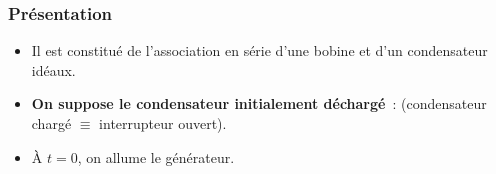 \documentclass[../../main/main.tex]{subfiles}
\begin{document}
\subsubsection{Présentation}
\begin{minipage}[c]{.6\linewidth}
	\begin{itemize}
		\item Il est constitué de l'association en série d'une bobine et d'un
		      condensateur idéaux.
		\item \textbf{On suppose le condensateur initialement déchargé}~:
		       (condensateur chargé
		      $\equiv$ interrupteur ouvert).
		\item À $t=0$, on allume le
		      générateur.
	\end{itemize}
\end{minipage}
\hfill
\begin{minipage}[c]{.35\linewidth}
	~
	\begin{center}
	\end{center}
\end{minipage}
\end{document}
